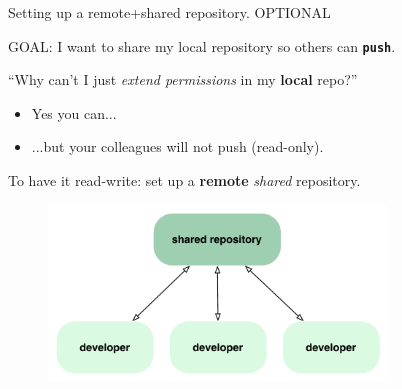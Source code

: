 \documentclass{beamer}
\begin{document}

\begin{frame}{Setting up a remote+shared repository. \alert{OPTIONAL}}
  \begin{center}
    GOAL: I want to share my local repository so others can \texttt{\textbf{push}}.
  \end{center}
  ``Why can't I just \emph{extend permissions} in my \textbf{local} repo?''
  \begin{itemize}
  \item Yes you can...
  \item ...but your colleagues will not push (\alert{read-only}).
  \end{itemize}
  \begin{center}
    To have it \alert{read-write}: set up a \textbf{remote}
    \emph{shared} repository.
  \end{center}
  \begin{figure}
    \centering
    \includegraphics[width=9cm]{UniBo.IDSEPC.A2022.LavoroCondiviso/workflow-a}
  \end{figure}
\end{frame}
\end{document}
